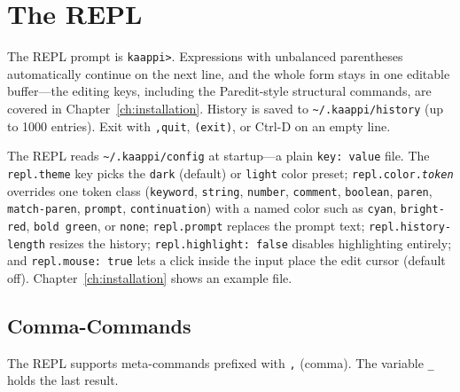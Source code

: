 \section{The REPL}

The REPL prompt is \texttt{kaappi>}. Expressions with unbalanced parentheses automatically continue on the next line, and the whole form stays in one editable buffer---the editing keys, including the Paredit-style structural commands, are covered in Chapter~\ref{ch:installation}. History is saved to \texttt{\textasciitilde/.kaappi/history} (up to 1000 entries). Exit with \texttt{,quit}, \texttt{(exit)}, or Ctrl-D on an empty line.

The REPL reads \texttt{\textasciitilde/.kaappi/config} at startup---a plain \texttt{key: value} file. The \texttt{repl.theme} key picks the \texttt{dark} (default) or \texttt{light} color preset; \texttt{repl.color.\emph{token}} overrides one token class (\texttt{keyword}, \texttt{string}, \texttt{number}, \texttt{comment}, \texttt{boolean}, \texttt{paren}, \texttt{match-paren}, \texttt{prompt}, \texttt{continuation}) with a named color such as \texttt{cyan}, \texttt{bright-red}, \texttt{bold green}, or \texttt{none}; \texttt{repl.prompt} replaces the prompt text; \texttt{repl.history-length} resizes the history; \texttt{repl.highlight: false} disables highlighting entirely; and \texttt{repl.mouse: true} lets a click inside the input place the edit cursor (default off). Chapter~\ref{ch:installation} shows an example file.

\subsection{Comma-Commands}

The REPL supports meta-commands prefixed with \texttt{,} (comma). The variable \texttt{\_} holds the last result.

